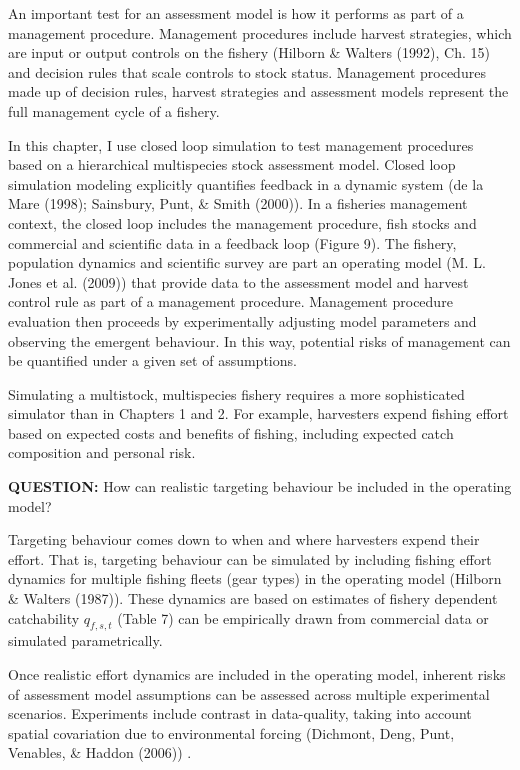 \documentclass[12pt,]{scrartcl}
\begin{document}
An important test for an assessment model is how it performs as part of
a management procedure. Management procedures include harvest
strategies, which are input or output controls on the fishery (Hilborn
\& Walters (1992), Ch. 15) and decision rules that scale controls to
stock status. Management procedures made up of decision rules, harvest
strategies and assessment models represent the full management cycle of
a fishery.

In this chapter, I use closed loop simulation to test management
procedures based on a hierarchical multispecies stock assessment model.
Closed loop simulation modeling explicitly quantifies feedback in a
dynamic system (de la Mare (1998); Sainsbury, Punt, \& Smith (2000)). In
a fisheries management context, the closed loop includes the management
procedure, fish stocks and commercial and scientific data in a feedback
loop (Figure 9). The fishery, population dynamics and scientific survey
are part an operating model (M. L. Jones et al. (2009)) that provide
data to the assessment model and harvest control rule as part of a
management procedure. Management procedure evaluation then proceeds by
experimentally adjusting model parameters and observing the emergent
behaviour. In this way, potential risks of management can be quantified
under a given set of assumptions.

Simulating a multistock, multispecies fishery requires a more
sophisticated simulator than in Chapters 1 and 2. For example,
harvesters expend fishing effort based on expected costs and benefits of
fishing, including expected catch composition and personal risk.

\textbf{QUESTION:} How can realistic targeting behaviour be included in
the operating model?

Targeting behaviour comes down to when and where harvesters expend their
effort. That is, targeting behaviour can be simulated by including
fishing effort dynamics for multiple fishing fleets (gear types) in the
operating model (Hilborn \& Walters (1987)). These dynamics are based on
estimates of fishery dependent catchability \(q_{f,s,t}\) (Table 7) can
be empirically drawn from commercial data or simulated parametrically.

Once realistic effort dynamics are included in the operating model,
inherent risks of assessment model assumptions can be assessed across
multiple experimental scenarios. Experiments include contrast in
data-quality, taking into account spatial covariation due to
environmental forcing (Dichmont, Deng, Punt, Venables, \& Haddon (2006))
.
\end{document}
